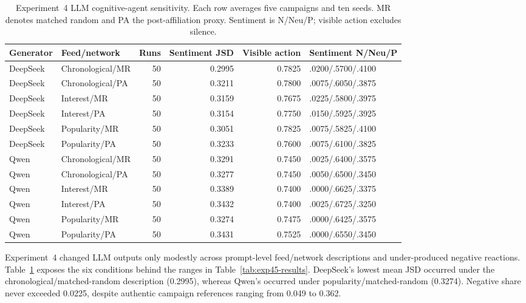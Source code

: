 \documentclass[conference]{IEEEtran}
\begin{document}
\begin{table}[!t]
\caption{Experiment~4 LLM cognitive-agent sensitivity. Each row averages five
campaigns and ten seeds. MR denotes matched random and PA the post-affiliation
proxy. Sentiment is N/Neu/P; visible action excludes silence.}
\label{tab:exp4-llm-detail}
\centering
\footnotesize
\begin{tabular}{@{}llrrrl@{}}
\toprule
Generator & Feed/network & Runs & Sentiment JSD & Visible action & Sentiment N/Neu/P \\
\midrule
DeepSeek & Chronological/MR & 50 & 0.2995 & 0.7825 & .0200/.5700/.4100 \\
DeepSeek & Chronological/PA & 50 & 0.3211 & 0.7800 & .0075/.6050/.3875 \\
DeepSeek & Interest/MR      & 50 & 0.3159 & 0.7675 & .0225/.5800/.3975 \\
DeepSeek & Interest/PA      & 50 & 0.3154 & 0.7750 & .0150/.5925/.3925 \\
DeepSeek & Popularity/MR    & 50 & 0.3051 & 0.7825 & .0075/.5825/.4100 \\
DeepSeek & Popularity/PA    & 50 & 0.3233 & 0.7600 & .0075/.6100/.3825 \\
Qwen & Chronological/MR     & 50 & 0.3291 & 0.7450 & .0025/.6400/.3575 \\
Qwen & Chronological/PA     & 50 & 0.3277 & 0.7450 & .0050/.6500/.3450 \\
Qwen & Interest/MR          & 50 & 0.3389 & 0.7400 & .0000/.6625/.3375 \\
Qwen & Interest/PA          & 50 & 0.3432 & 0.7400 & .0025/.6725/.3250 \\
Qwen & Popularity/MR        & 50 & 0.3274 & 0.7475 & .0000/.6425/.3575 \\
Qwen & Popularity/PA        & 50 & 0.3431 & 0.7525 & .0000/.6550/.3450 \\
\bottomrule
\end{tabular}
\end{table}

Experiment~4 changed LLM outputs only modestly across prompt-level
feed/network descriptions and under-produced negative reactions.
Table~\ref{tab:exp4-llm-detail} exposes the six conditions behind the ranges
in Table~\ref{tab:exp45-results}. DeepSeek's lowest mean JSD occurred under the
chronological/matched-random description (0.2995), whereas Qwen's occurred
under popularity/matched-random (0.3274). Negative share never exceeded 0.0225,
despite authentic campaign references ranging from 0.049 to 0.362.
\end{document}
